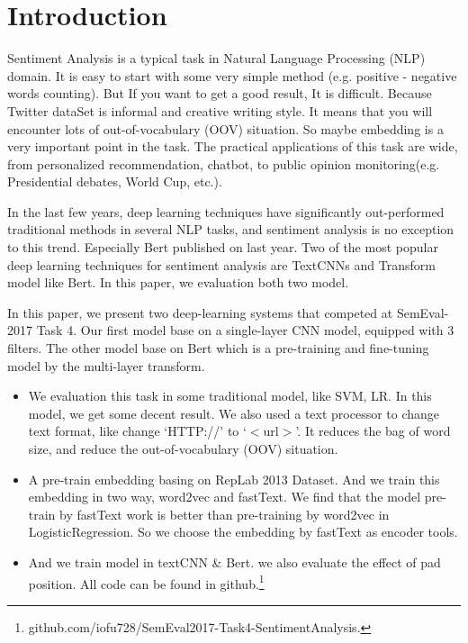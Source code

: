\section{Introduction}

Sentiment Analysis is a typical task in Natural Language Processing (NLP) domain. It is easy to start with some very simple method (e.g. positive - negative words counting). But If you want to get a good result, It is difficult. Because Twitter dataSet is informal and creative writing style. It means that you will encounter lots of out-of-vocabulary (OOV) situation. So maybe embedding is a very important point in the task. The practical applications of this task are wide, from personalized recommendation, chatbot, to public opinion monitoring(e.g. Presidential debates, World Cup, etc.).

In the last few years, deep learning techniques have significantly out-performed traditional methods in several NLP tasks,  and sentiment analysis is no exception to this trend. Especially Bert published on last year. Two of the most popular deep learning techniques for sentiment analysis are TextCNNs and Transform model like Bert. In this paper, we evaluation both two model.

In this paper, we present two deep-learning systems that competed at SemEval-2017 Task 4. Our first model base on a single-layer CNN model, equipped with 3 filters. The other model base on Bert which is a pre-training and fine-tuning model by the multi-layer transform.

\begin{itemize}
  \item  We evaluation this task in some traditional model, like SVM, LR. In this model, we get some decent result. We also used a text processor to change text format, like change `HTTP://' to `$<$url$>$'. It reduces the bag of word size, and reduce the out-of-vocabulary (OOV) situation.
  \item A pre-train embedding basing on RepLab 2013 Dataset. And we train this embedding in two way, word2vec and fastText. We find that the model pre-train by fastText work is better than pre-training by word2vec in LogisticRegression. So we choose the embedding by fastText as encoder tools.
  \item And we train model in textCNN \& Bert. we also evaluate the effect of pad position. All code can be found in github.\footnote{github.com/iofu728/SemEval2017-Task4-SentimentAnalysis.}
\end{itemize}
